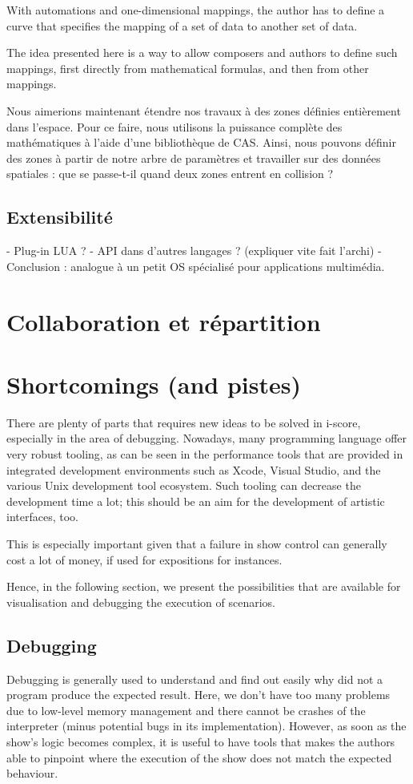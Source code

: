 \documentclass{sigchi}
\begin{document}
With automations and one-dimensional mappings, the author has to define a curve that specifies the mapping of a set of data to another set of data.

The idea presented here is a way to allow composers and authors to define such mappings, first directly from mathematical formulas, and then from other mappings.


Nous aimerions maintenant étendre nos travaux à des zones définies entièrement dans l'espace. Pour ce faire, nous utilisons la puissance complète des mathématiques à l'aide d'une bibliothèque de CAS. Ainsi, nous pouvons définir des zones à partir de notre arbre de paramètres et travailler sur des données spatiales : que se passe-t-il quand deux zones entrent en collision ?
    
\subsection{Extensibilité}
- Plug-in LUA ? 
- API dans d'autres langages ? (expliquer vite fait l'archi)
- Conclusion : analogue à un petit OS spécialisé pour applications multimédia.

\section{Collaboration et répartition}
\section{Shortcomings (and pistes)}
There are plenty of parts that requires new ideas to be solved in i-score, especially in the area of debugging. Nowadays, many programming language offer very robust tooling, as can be seen in the performance tools that are provided in integrated development environments such as Xcode, Visual Studio, and the various Unix development tool ecosystem\cite{spinellis2014software}. Such tooling can decrease the development time a lot; this should be an aim for the development of artistic interfaces, too.

This is especially important given that a failure in show control can generally cost a lot of money, if used for expositions for instances.

Hence, in the following section, we present the possibilities that are available for visualisation and debugging the execution of scenarios.


\subsection{Debugging}
Debugging is generally used to understand and find out easily why did not a program produce the expected result. Here, we don't have too many problems due to low-level memory management and there cannot be crashes of the interpreter (minus potential bugs in its implementation).  However, as soon as the show's logic becomes complex, it is useful to have tools that makes the authors able to pinpoint where the execution of the show does not match the expected behaviour.
\end{document}
